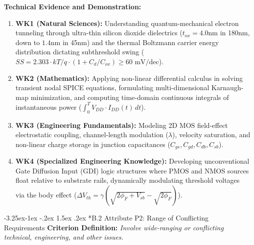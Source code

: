 \documentclass[12pt,a4paper,oneside]{report}
\makeatletter
\renewcommand\subsection{\@startsection{subsection}{2}{\z@}%
                                     {-3.25ex\@plus -1ex \@minus -.2ex}%
                                     {1.5ex \@plus .2ex}%
                                     {\normalfont\normalsize\bfseries\itshape}}
\makeatother
\begin{document}
\noindent\textbf{Technical Evidence and Demonstration:}
\begin{enumerate}
\item \textbf{WK1 (Natural Sciences):} Understanding quantum-mechanical electron tunneling through ultra-thin silicon dioxide dielectrics ($t_{ox} = 4.0\text{nm}$ in 180nm, down to $1.4\text{nm}$ in 45nm) and the thermal Boltzmann carrier energy distribution dictating subthreshold swing ($SS = 2.303 \cdot kT/q \cdot (1 + C_d/C_{ox}) \ge 60\text{ mV/dec}$).
\item \textbf{WK2 (Mathematics):} Applying non-linear differential calculus in solving transient nodal SPICE equations, formulating multi-dimensional Karnaugh-map minimization, and computing time-domain continuous integrals of instantaneous power ($\int_0^T V_{DD} \cdot I_{DD}(t) \, dt$).
\item \textbf{WK3 (Engineering Fundamentals):} Modeling 2D MOS field-effect electrostatic coupling, channel-length modulation ($\lambda$), velocity saturation, and non-linear charge storage in junction capacitances ($C_{gs}, C_{gd}, C_{db}, C_{sb}$).
\item \textbf{WK4 (Specialized Engineering Knowledge):} Developing unconventional Gate Diffusion Input (GDI) logic structures where PMOS and NMOS sources float relative to substrate rails, dynamically modulating threshold voltages via the body effect ($\Delta V_{th} = \gamma (\sqrt{2\phi_F + V_{sb}} - \sqrt{2\phi_F})$).
\end{enumerate}

\subsection*{B.2 Attribute P2: Range of Conflicting Requirements}
\textbf{Criterion Definition:} \textit{Involve wide-ranging or conflicting technical, engineering, and other issues.}
\end{document}
